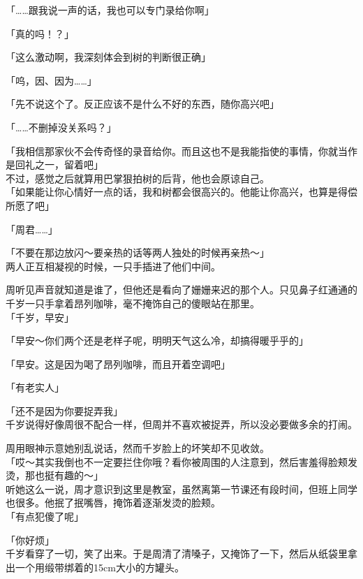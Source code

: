 「……跟我说一声的话，我也可以专门录给你啊」

「真的吗！？」

「这么激动啊，我深刻体会到树的判断很正确」

「呜，因、因为……」

「先不说这个了。反正应该不是什么不好的东西，随你高兴吧」

「……不删掉没关系吗？」

「我相信那家伙不会传奇怪的录音给你。而且这也不是我能指使的事情，你就当作是回礼之一，留着吧」\\

不过，感觉之后就算用巴掌狠拍树的后背，他也会原谅自己。\\

「如果能让你心情好一点的话，我和树都会很高兴的。他能让你高兴，也算是得偿所愿了吧」

「周君……」

「不要在那边放闪～要亲热的话等两人独处的时候再亲热～」\\

两人正互相凝视的时候，一只手插进了他们中间。

周听见声音就知道是谁了，但他还是看向了姗姗来迟的那个人。只见鼻子红通通的千岁一只手拿着昂列咖啡，毫不掩饰自己的傻眼站在那里。\\

「千岁，早安」

「早安～你们两个还是老样子呢，明明天气这么冷，却搞得暖乎乎的」

「早安。这是因为喝了昂列咖啡，而且开着空调吧」

「有老实人」

「还不是因为你要捉弄我」\\

千岁说得好像周很不配合一样，但周并不喜欢被捉弄，所以没必要做多余的打闹。

周用眼神示意她别乱说话，然而千岁脸上的坏笑却不见收敛。\\

「哎～其实我倒也不一定要拦住你哦？看你被周围的人注意到，然后害羞得脸颊发烫，那也挺有趣的～」\\

听她这么一说，周才意识到这里是教室，虽然离第一节课还有段时间，但班上同学也很多。他抿了抿嘴唇，掩饰着逐渐发烫的脸颊。\\

「有点犯傻了呢」

「你好烦」\\

千岁看穿了一切，笑了出来。于是周清了清嗓子，又掩饰了一下，然后从纸袋里拿出一个用缎带绑着的15cm大小的方罐头。\\

